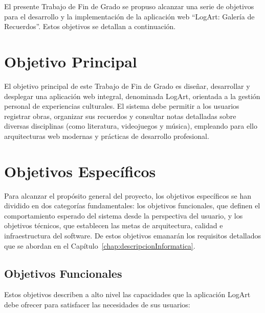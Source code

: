 El presente Trabajo de Fin de Grado se propuso alcanzar una serie de objetivos para el desarrollo y la implementación de la aplicación web ``LogArt: Galería de Recuerdos''. Estos objetivos se detallan a continuación.

\section{Objetivo Principal}
\label{sec:objetivoPrincipal}

El objetivo principal de este Trabajo de Fin de Grado es diseñar, desarrollar y desplegar una aplicación web integral, denominada LogArt, orientada a la gestión personal de experiencias culturales. El sistema debe permitir a los usuarios registrar obras, organizar sus recuerdos y consultar notas detalladas sobre diversas disciplinas (como literatura, videojuegos y música), empleando para ello arquitecturas web modernas y prácticas de desarrollo profesional.

\section{Objetivos Específicos}
\label{sec:objetivosEspecificos}

Para alcanzar el propósito general del proyecto, los objetivos específicos se han dividido en dos categorías fundamentales: los objetivos funcionales, que definen el comportamiento esperado del sistema desde la perspectiva del usuario, y los objetivos técnicos, que establecen las metas de arquitectura, calidad e infraestructura del software. De estos objetivos emanarán los requisitos detallados que se abordan en el Capítulo~\ref{chap:descripcionInformatica}.

\subsection{Objetivos Funcionales}
\label{sec:objetivosFuncionales}

Estos objetivos describen a alto nivel las capacidades que la aplicación LogArt debe ofrecer para satisfacer las necesidades de sus usuarios:

